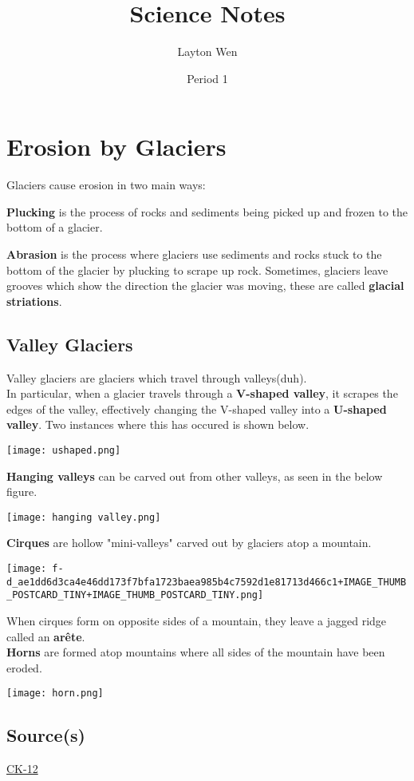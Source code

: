 \documentclass{article}
\title{Science Notes}
\author{Layton Wen}
\date{Period 1}
\begin{document}
\maketitle
\toc
\clearpage
\section{Erosion by Glaciers}
Glaciers cause erosion in two main ways:
\begin{definition}[Plucking]
\textbf{Plucking} is the process of rocks and sediments being picked up and frozen to the bottom of a glacier.
\end{definition}
\begin{definition}[Abrasion]
\textbf{Abrasion} is the process where glaciers use sediments and rocks stuck to the bottom of the glacier by plucking to scrape up rock. Sometimes, glaciers leave grooves which show the direction the glacier was moving, these are called \textbf{glacial striations}.
\end{definition}
\subsection{Valley Glaciers}
Valley glaciers are glaciers which travel through valleys(duh).\\[5pt] In particular, when a glacier travels through a \textbf{V-shaped valley}, it scrapes the edges of the valley, effectively changing the V-shaped valley into a \textbf{U-shaped valley}. Two instances where this has occured is shown below.
\begin{center}
    \texttt{[image: ushaped.png]}
\end{center}
\textbf{Hanging valleys} can be carved out from other valleys, as seen in the below figure.
\begin{center}
    \texttt{[image: hanging valley.png]}
\end{center}
\textbf{Cirques} are hollow "mini-valleys" carved out by glaciers atop a mountain. 
\begin{center}
    \texttt{[image: f-d\_ae1dd6d3ca4e46dd173f7bfa1723baea985b4c7592d1e81713d466c1+IMAGE\_THUMB\_POSTCARD\_TINY+IMAGE\_THUMB\_POSTCARD\_TINY.png]}
\end{center}
When cirques form on opposite sides of a mountain, they leave a jagged ridge called an \textbf{arête}.\\[5pt]
\textbf{Horns} are formed atop mountains where all sides of the mountain have been eroded.
\begin{center}
    \texttt{[image: horn.png]}
\end{center}
\subsection{Source(s)}
\href{https://flexbooks.ck12.org/cbook/ck-12-middle-school-earth-science-flexbook-2.0/section/14.10/primary/lesson/erosion-by-glaciers-ms-es}{CK-12}
\end{document}
